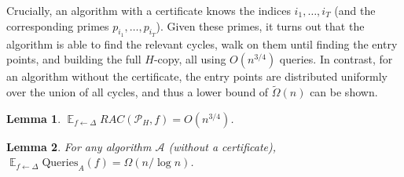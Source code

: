 \documentclass[11pt]{article}
\numberwithin{equation}{section}
\newtheorem{lemma}[lemma]{Lemma}
\newcommand\E{\mathop{\mathbb E}}
\newcommand{\Query}{\text{Queries}}
\renewcommand{\P}{\mathcal{P}}
\newcommand{\1}{\mathbf{1}}
\newcommand{\A}{\mathcal A}
\begin{document}
Crucially, an algorithm with a certificate knows the indices $i_1, \ldots, i_T$ (and the corresponding primes $p_{i_1}, \ldots, p_{i_T}$). Given these primes, it turns out that the algorithm is able to find the relevant cycles, walk on them until finding the entry points, and building the full $H$-copy, all using $O(n^{3/4})$ queries. In contrast, for an algorithm without the certificate, the entry points are distributed uniformly over the union of all cycles, and thus a lower bound of $\tilde\Omega(n)$ can be shown.

\begin{lemma} \label{fixedpointupper}
$\E_{f \leftarrow \Delta} RAC(\P_H, f) = O(n^{3/4})$.
\end{lemma}


\begin{lemma} \label{fixedpointlower}
For any algorithm $\A$ (without a certificate), $\E_{f \leftarrow \Delta} \Query_A(f) = \Omega(n / \log n)$.
\end{lemma}
\end{document}
